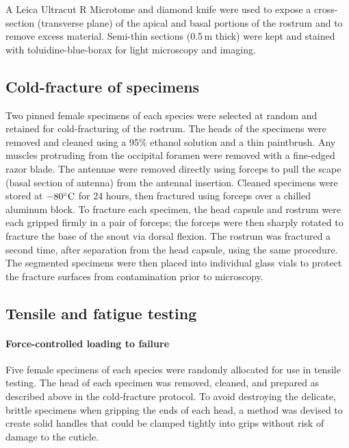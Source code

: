 \documentclass[twocolumn, linenumbers, superscriptaddress, nofootinbib]{revtex4-1}
\begin{document}
			A Leica Ultracut R Microtome and diamond knife were used to expose a cross-section (transverse plane) of the apical and basal portions of the rostrum and to remove excess material.
			Semi-thin sections (0.5\,{\textmu}m thick) were kept and stained with
			toluidine-blue-borax for light microscopy and imaging.
			
		\subsection*{Cold-fracture of specimens}
			Two pinned female specimens of each species were selected at random and retained for cold-fracturing of the rostrum.
			The heads of the specimens were removed and cleaned using a 95\% ethanol solution and a thin paintbrush.
			Any muscles protruding from the occipital foramen were removed with a fine-edged razor blade.
			The antennae were removed directly using forceps to pull the scape (basal section of antenna) from the antennal insertion.
			Cleaned specimens were stored at $-80\degree\text{C}$ for 24 hours, then fractured using forceps over a chilled aluminum block.
			To fracture each specimen, the head capsule and rostrum were each gripped firmly in a pair of forceps; the forceps were then sharply rotated to fracture the base of the snout via dorsal flexion.
			The rostrum was fractured a second time, after separation from the head capsule, using the same procedure.
			The segmented specimens were then placed into individual glass vials to protect the fracture surfaces from contamination prior to microscopy.
			
		\subsection*{Tensile and fatigue testing}
			\paragraph*{Force-controlled loading to failure}
				Five female specimens of each species were randomly allocated for use in tensile testing.
				The head of each specimen was removed, cleaned, and prepared as described above in the cold-fracture protocol.
				To avoid destroying the delicate, brittle specimens when gripping the ends of each head, a method was devised to create solid handles that could be clamped tightly into grips without risk of damage to the cuticle.
				
\end{document}
